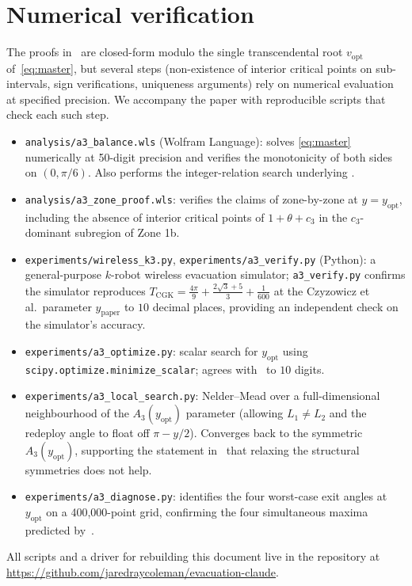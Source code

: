 \documentclass[11pt]{article}
\theoremstyle{plain}
\theoremstyle{definition}
\theoremstyle{remark}
\begin{document}
\section{Numerical verification}
\label{sec:experiments}

The proofs in~ are closed-form modulo the single
transcendental root $v_{\mathrm{opt}}$ of~\eqref{eq:master}, but several
steps (non-existence of interior critical points on sub-intervals,
sign verifications, uniqueness arguments) rely on numerical evaluation
at specified precision. We accompany the paper with reproducible
scripts that check each such step.

\begin{itemize}
\item \texttt{analysis/a3\_balance.wls} (Wolfram Language): solves
\eqref{eq:master} numerically at 50-digit precision and verifies the
monotonicity of both sides on $(0, \pi/6)$. Also performs the
integer-relation search underlying .
\item \texttt{analysis/a3\_zone\_proof.wls}: verifies the claims of
 zone-by-zone at $y = y_{\mathrm{opt}}$, including
the absence of interior critical points of $1 + \theta + c_3$ in the
$c_3$-dominant subregion of Zone 1b.
\item \texttt{experiments/wireless\_k3.py}, \texttt{experiments/a3\_verify.py}
(Python): a general-purpose $k$-robot wireless evacuation simulator;
\texttt{a3\_verify.py} confirms the simulator reproduces $T_{\mathrm{CGK}} =
\frac{4\pi}{9} + \frac{2\sqrt 3 + 5}{3} + \frac{1}{600}$ at the
Czyzowicz et al.\ parameter $y_{\mathrm{paper}}$ to $10$ decimal places,
providing an independent check on the simulator's accuracy.
\item \texttt{experiments/a3\_optimize.py}: scalar search for
$y_{\mathrm{opt}}$ using \texttt{scipy.optimize.minimize\_scalar}; agrees
with~ to $10$ digits.
\item \texttt{experiments/a3\_local\_search.py}: Nelder--Mead over a
full-dimensional neighbourhood of the $A_3(y_{\mathrm{opt}})$ parameter
(allowing $L_1 \ne L_2$ and the redeploy angle to float off $\pi - y/2$).
Converges back to the symmetric $A_3(y_{\mathrm{opt}})$, supporting the
statement in~ that relaxing the structural symmetries
does not help.
\item \texttt{experiments/a3\_diagnose.py}: identifies the four
worst-case exit angles at $y_{\mathrm{opt}}$ on a 400,000-point grid,
confirming the four simultaneous maxima predicted by~.
\end{itemize}
All scripts and a driver for rebuilding this document live in the
repository at \url{https://github.com/jaredraycoleman/evacuation-claude}.
\end{document}
